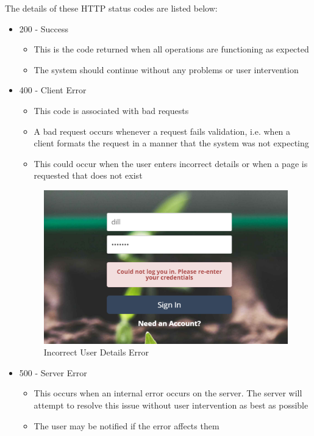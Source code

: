 \documentclass{article}
\begin{document}
	The details of these HTTP status codes are listed below:
	\begin{itemize}
		\item 200 - Success
			\begin{itemize}
				\item This is the code returned when all operations are functioning as expected
				\item The system should continue without any problems or user intervention
			\end{itemize}
		\item 400 - Client Error
			\begin{itemize}
				\item This code is associated with bad requests
				\item A bad request occurs whenever a request fails validation, i.e. when a client formats the request in a manner that the system was not expecting
				\item This could occur when the user enters incorrect details or when a page is requested that does not exist
			\end{itemize}
			\begin{figure}[H]
				\includegraphics[width=\textwidth]{../images/UserManual/400error.png}
				\caption{Incorrect User Details Error}
			\end{figure}
		\item 500 - Server Error
			\begin{itemize}
				\item This occurs when an internal error occurs on the server. The server will attempt to resolve this issue without user intervention as best as possible
				\item The user may be notified if the error affects them

\end{itemize}
\end{itemize}
\end{document}
